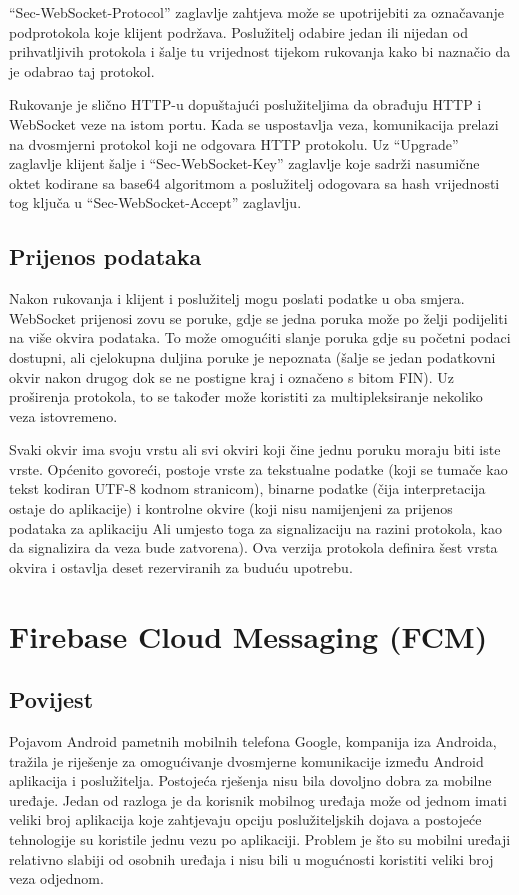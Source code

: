 \documentclass[times, utf8, zavrsni]{fer}
\begin{document}
``Sec-WebSocket-Protocol'' zaglavlje zahtjeva može se upotrijebiti za označavanje podprotokola koje klijent podržava. Poslužitelj odabire jedan ili nijedan od prihvatljivih protokola i šalje tu vrijednost tijekom rukovanja kako bi naznačio da je odabrao taj protokol.

Rukovanje je slično HTTP-u dopuštajući poslužiteljima da obrađuju HTTP i WebSocket veze na istom portu. Kada se uspostavlja veza, komunikacija prelazi na dvosmjerni protokol koji ne odgovara HTTP protokolu. Uz ``Upgrade'' zaglavlje klijent šalje i ``Sec-WebSocket-Key'' zaglavlje koje sadrži nasumične oktet kodirane sa base64 algoritmom a poslužitelj odogovara sa hash vrijednosti tog ključa u ``Sec-WebSocket-Accept'' zaglavlju.

\subsection{Prijenos podataka}
Nakon rukovanja i klijent i poslužitelj mogu poslati podatke u oba smjera. WebSocket prijenosi zovu se poruke, gdje se jedna poruka može po želji podijeliti na više okvira podataka. To može omogućiti slanje poruka gdje su početni podaci dostupni, ali cjelokupna duljina poruke je nepoznata (šalje se jedan podatkovni okvir nakon drugog dok se ne postigne kraj i označeno s bitom FIN). Uz proširenja protokola, to se također može koristiti za multipleksiranje nekoliko veza istovremeno. 

Svaki okvir ima svoju vrstu ali svi okviri koji čine jednu poruku moraju biti iste vrste. Općenito govoreći, postoje vrste za tekstualne podatke (koji se tumače kao tekst kodiran UTF-8 kodnom stranicom), binarne podatke (čija interpretacija ostaje do aplikacije) i kontrolne okvire (koji nisu namijenjeni za prijenos podataka za aplikaciju Ali umjesto toga za signalizaciju na razini protokola, kao da signalizira da veza bude zatvorena). Ova verzija protokola definira šest vrsta okvira i ostavlja deset rezerviranih za buduću upotrebu.

\section{Firebase Cloud Messaging (FCM)}

\subsection{Povijest}
Pojavom Android pametnih mobilnih telefona Google, kompanija iza Androida, tražila je riješenje za omogućivanje dvosmjerne komunikacije između Android aplikacija i poslužitelja. Postojeća rješenja nisu bila dovoljno dobra za mobilne uređaje. Jedan od razloga je da korisnik mobilnog uređaja može od jednom imati veliki broj aplikacija koje zahtjevaju opciju poslužiteljskih dojava a postojeće tehnologije su koristile jednu vezu po aplikaciji. Problem je što su mobilni uređaji relativno slabiji od osobnih uređaja i nisu bili u mogućnosti koristiti veliki broj veza odjednom.
\end{document}
